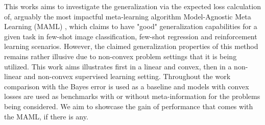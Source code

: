 This works aims to investigate the generalization via the expected loss calculation of, arguably the most impactful meta-learning algorithm Model-Agnostic Meta Learning (MAML) \cite{Finn2017}, which claims to have "good" generalization capabilities for a given task in few-shot image classification, few-shot regression and reinforcement learning scenarios. However, the claimed generalization properties of this method remains rather illusive due to non-convex problem settings that it is being utilized. This work aims illustrates first in a linear and convex, then in a non-linear and non-convex supervised learning setting.  Throughout the work comparison with the Bayes error is used as a baseline and models with convex losses are used as benchmarks with or without meta-information for the problems being considered. We aim to showcase the gain of performance that comes with the MAML, if there is any.


